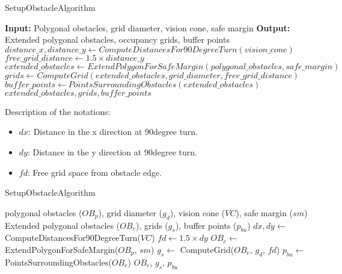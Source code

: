 \begin{algorithm}[H]
    \caption{SetupObstacleAlgorithm}
    \begin{algorithmic}[1]
        \Statex \textbf{Input:} Polygonal obstacles, grid diameter, vision cone, safe margin
        \Statex \textbf{Output:} Extended polygonal obstacles, occupancy grids, buffer points
        \newline
        \State $distance\_x, distance\_y \gets ComputeDistancesFor90DegreeTurn(vision\_cone)$
        \State $free\_grid\_distance \gets 1.5 \times distance\_y$
        \State $extended\_obstacles \gets ExtendPolygonForSafeMargin(polygonal\_obstacles, safe\_margin)$
        \State $grids \gets ComputeGrid(extended\_obstacles, grid\_diameter, free\_grid\_distance)$
        \State $buffer\_points \gets PointsSurroundingObstacles(extended\_obstacles)$
        \State \Return $extended\_obstacles, grids, buffer\_points$
    \end{algorithmic}
\end{algorithm}

Description of the notations:
\begin{itemize}[noitemsep,topsep=0pt]
    \item $dx$: Distance in the x direction at 90degree turn.
    \item $dy$: Distance in the y direction at 90degree turn.
    \item $fd$: Free grid space from obstacle edge.  
\end{itemize}

\begin{algorithm}[H]
    \caption{SetupObstacleAlgorithm}
    \label{alg:setup_obstacle_algorithm}
    \begin{algorithmic}[1]
    \Require polygonal obstacles ($OB_p$), grid diameter ($g_d$), vision cone ($VC$), safe margin ($sm$)
    \Ensure Extended polygonal obstacles ($OB_e$), grids ($g_s$), buffer points ($p_{bu}$)
    \State $dx, dy \leftarrow$ ComputeDistancesFor90DegreeTurn($VC$)
    \State $fd \leftarrow 1.5 \times dy$
    \State $OB_e \leftarrow$ ExtendPolygonForSafeMargin($OB_p$, $sm$)
    \State $g_s \leftarrow$ ComputeGrid($OB_e$, $g_d$, $fd$)
    \State $p_{bu} \leftarrow$ PointsSurroundingObstacles($OB_e$)
    \State \Return $OB_e$, $g_s$, $p_{bu}$
    \end{algorithmic}
    \end{algorithm}

